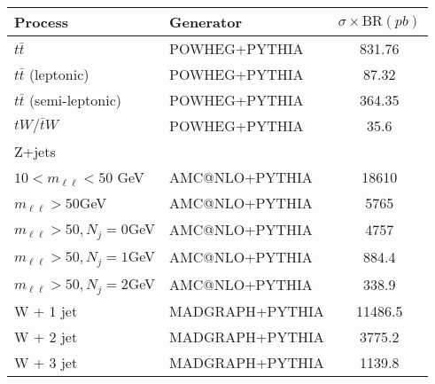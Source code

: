 \begin{table}
    \centering
    \setlength{\tabcolsep}{1.5em}
    \renewcommand{\arraystretch}{1.25}
    \small

    \begin{tabular}{l l c}
        \hline
        Process                                           & Generator         & $\sigma \times \text{BR} (pb)$ \\
        \hline \hline
        $t\bar{t}$                                        & POWHEG+PYTHIA     & 831.76                         \\
        $t\bar{t}$  (leptonic)                            & POWHEG+PYTHIA     & 87.32                          \\
        $t\bar{t}$  (semi-leptonic)                       & POWHEG+PYTHIA     & 364.35                         \\
        $tW/\bar{t}W$                                     & POWHEG+PYTHIA     & 35.6                           \\
        \hline
        Z+jets                                            &                  &                                \\
        \hspace*{1em} $10 < m_{\ell\ell} < 50$ GeV        & AMC@NLO+PYTHIA   & 18610                          \\
        \hspace*{1em} $m_{\ell\ell} > 50 $GeV             & AMC@NLO+PYTHIA   & 5765                           \\
        \hspace*{1em} $m_{\ell\ell} > 50, N_{j} = 0 $GeV  & AMC@NLO+PYTHIA   & 4757                           \\
        \hspace*{1em} $m_{\ell\ell} > 50, N_{j} = 1 $GeV  & AMC@NLO+PYTHIA   & 884.4                          \\
        \hspace*{1em} $m_{\ell\ell} > 50, N_{j} = 2 $GeV  & AMC@NLO+PYTHIA   & 338.9                          \\
        \hline
        W + 1 jet                                         & MADGRAPH+PYTHIA  & 11486.5                        \\
        W + 2 jet                                         & MADGRAPH+PYTHIA  & 3775.2                         \\
        W + 3 jet                                         & MADGRAPH+PYTHIA  & 1139.8                         \\

\end{tabular}
\end{table}
